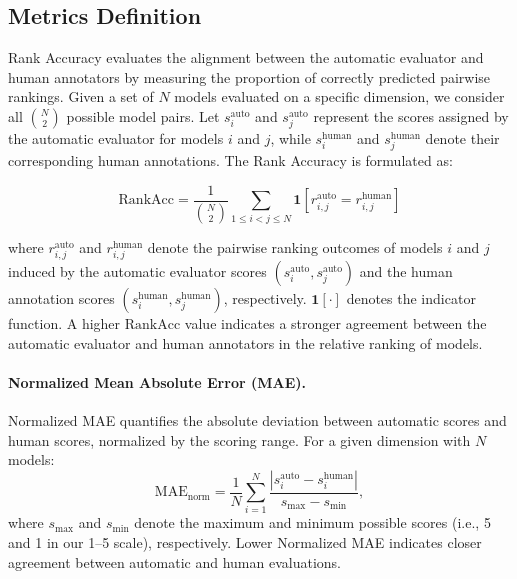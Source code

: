 \subsection{Metrics Definition}
\label{app:metrics}

Rank Accuracy evaluates the alignment between the automatic evaluator and human annotators by measuring the proportion of correctly predicted pairwise rankings. Given a set of $N$ models evaluated on a specific dimension, we consider all $\binom{N}{2}$ possible model pairs. Let $s_i^{\text{auto}}$ and $s_j^{\text{auto}}$ represent the scores assigned by the automatic evaluator for models $i$ and $j$, while $s_i^{\text{human}}$ and $s_j^{\text{human}}$ denote their corresponding human annotations. The Rank Accuracy is formulated as:

\begin{equation}
\mathrm{RankAcc}
=
\frac{1}{\binom{N}{2}}
\sum_{1 \le i < j \le N}
\mathbf{1}\!\left[
r_{i,j}^{\mathrm{auto}} = r_{i,j}^{\mathrm{human}}
\right]
\end{equation}

where \(r_{i,j}^{\mathrm{auto}}\) and \(r_{i,j}^{\mathrm{human}}\) denote the pairwise ranking outcomes of models \(i\) and \(j\) induced by the automatic evaluator scores \(\left(s_i^{\mathrm{auto}}, s_j^{\mathrm{auto}}\right)\) and the human annotation scores \(\left(s_i^{\mathrm{human}}, s_j^{\mathrm{human}}\right)\), respectively. \(\mathbf{1}[\cdot]\) denotes the indicator function. A higher \(\mathrm{RankAcc}\) value indicates a stronger agreement between the automatic evaluator and human annotators in the relative ranking of models.

\paragraph{Normalized Mean Absolute Error (MAE).}
Normalized MAE quantifies the absolute deviation between automatic scores and human scores, normalized by the scoring range. For a given dimension with $N$ models:
\begin{equation}
    \text{MAE}_{\text{norm}} = \frac{1}{N} \sum_{i=1}^{N} \frac{|s_i^{\text{auto}} - s_i^{\text{human}}|}{s_{\max} - s_{\min}},
\end{equation}
where $s_{\max}$ and $s_{\min}$ denote the maximum and minimum possible scores (i.e., 5 and 1 in our 1--5 scale), respectively. Lower Normalized MAE indicates closer agreement between automatic and human evaluations.

